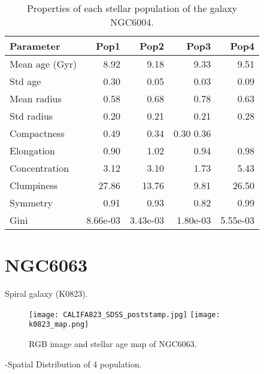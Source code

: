 \begin{table}[h]
\centering
\begin{tabular}{l|r|r|r|r}
Parameter & Pop1 & Pop2 & Pop3 & Pop4 \\\hline
Mean age (Gyr) & 8.92 & 9.18 & 9.33 & 9.51 \\
Std age & 0.30 & 0.05 & 0.03 & 0.09 \\
Mean radius & 0.58 & 0.68 & 0.78 & 0.63 \\
Std radius & 0.20 & 0.21 & 0.21 & 0.28 \\
Compactness & 0.49 & 0.34 & 0.30  0.36 \\
Elongation & 0.90 & 1.02 & 0.94 & 0.98 \\
Concentration & 3.12 & 3.10 & 1.73 & 5.43 \\
Clumpiness & 27.86 & 13.76 & 9.81 & 26.50\\
Symmetry & 0.91 & 0.93 & 0.82 & 0.99\\
Gini & 8.66e-03 & 3.43e-03 & 1.80e-03 & 5.55e-03 \\
\end{tabular}
\caption{\label{tab:widgets}Properties of each stellar population of the galaxy NGC6004.}
\end{table}



\newpage
\section*{NGC6063}
Spiral galaxy (K0823).

\begin{figure}[bh]
\begin{center}
\texttt{[image: CALIFA823\_SDSS\_poststamp.jpg]}
\texttt{[image: k0823\_map.png]}
\caption{RGB image and stellar age map of NGC6063.}
   \label{fig1}
\end{center}
\end{figure}

-Spatial Distribution of 4 population.


